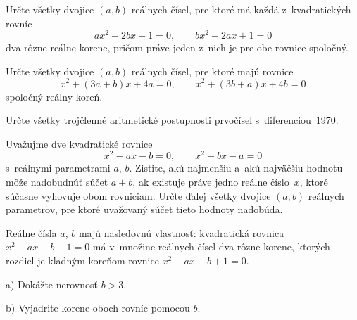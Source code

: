 {Určte všetky dvojice $(a,b)$ reálnych čísel, pre ktoré má každá
z~kvadratických rovníc
$$
ax^2+2bx+1=0, \qquad bx^2+2ax+1=0
$$
dva rôzne reálne korene, pričom práve jeden z~nich je pre obe rovnice
spoločný.
\vpravo{[57--B--I--5]}

Určte všetky dvojice $(a,b)$ reálnych čísel, pre ktoré majú rovnice
$$
x^2+(3a+b)x+4a=0, \qquad x^2+(3b+a)x+4b=0
$$
spoločný reálny koreň.
\vpravo{[57--B--S--2]}

\D
Určte všetky trojčlenné aritmetické postupnosti prvočísel
s~diferenciou~1970.
\vpravo{[20--B--P--2]}

Uvažujme dve kvadratické rovnice
$$
x^2-ax-b=0, \qquad x^2-bx-a=0
$$
s~reálnymi parametrami $a$, $b$.
Zistite, akú najmenšiu a~akú najväčšiu hodnotu môže nadobudnúť súčet $a+b$,
ak existuje práve jedno reálne číslo~$x$, ktoré súčasne vyhovuje obom
rovniciam. Určte ďalej všetky dvojice $(a,b)$ reálnych parametrov, pre ktoré
uvažovaný súčet tieto hodnoty nadobúda.
\vpravo{[57--B--II--1]}

Reálne čísla $a$, $b$ majú nasledovnú vlastnosť: kvadratická rovnica
$x^2-ax+b-1=0$ má v~množine reálnych čísel dva rôzne korene, ktorých
  rozdiel je kladným koreňom rovnice $x^2-ax+b+1=0$.
\item{a)} Dokážte nerovnosť $b>3$.
\item{b)} Vyjadrite korene oboch rovníc pomocou $b$.\endgraf
\vpravo{[59--B--I--6]}
}

